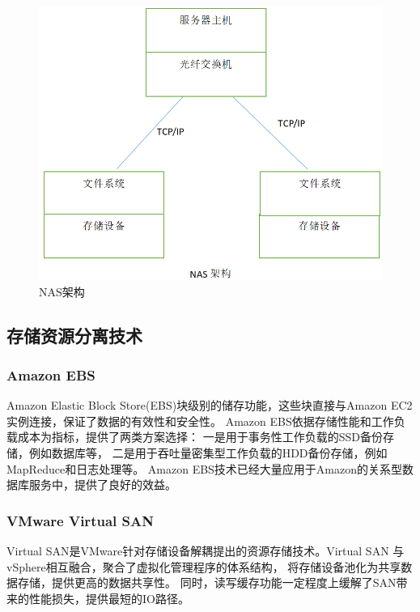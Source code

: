 \begin{figure}
\centering
\includegraphics[scale=0.45]{Figures/storage/nas_architecture.jpg}
\decoRule
\caption{NAS架构}
\label{fig:nas_architecture}
\end{figure}
\subsection{存储资源分离技术}
\subsubsection{Amazon EBS}
Amazon Elastic Block Store(EBS)\cite{amazon2010amazon}块级别的储存功能，这些块直接与Amazon EC2
实例连接，保证了数据的有效性和安全性。
Amazon EBS依据存储性能和工作负载成本为指标，提供了两类方案选择：
一是用于事务性工作负载的SSD备份存储，例如数据库等，
二是用于吞吐量密集型工作负载的HDD备份存储，例如MapReduce和日志处理等。
Amazon EBS技术已经大量应用于Amazon的关系型数据库服务中，提供了良好的效益。
\subsubsection{VMware Virtual SAN}
Virtual SAN\cite{vmware2013vmware}是VMware针对存储设备解耦提出的资源存储技术。Virtual SAN
与vSphere相互融合，聚合了虚拟化管理程序的体系结构，
将存储设备池化为共享数据存储，提供更高的数据共享性。
同时，读写缓存功能一定程度上缓解了SAN带来的性能损失，提供最短的IO路径。

